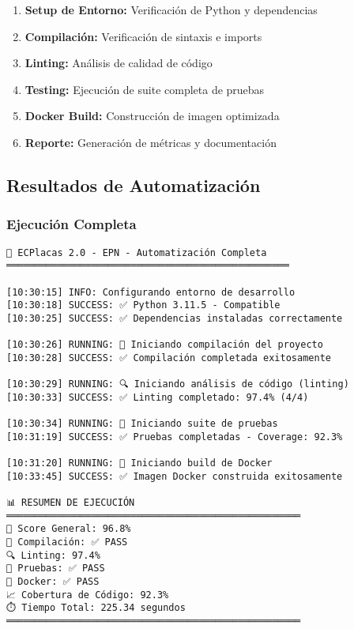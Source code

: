 \documentclass[12pt,a4paper]{article}
\begin{document}
\begin{enumerate}
    \item \textbf{Setup de Entorno:} Verificación de Python y dependencias
    \item \textbf{Compilación:} Verificación de sintaxis e imports
    \item \textbf{Linting:} Análisis de calidad de código
    \item \textbf{Testing:} Ejecución de suite completa de pruebas
    \item \textbf{Docker Build:} Construcción de imagen optimizada
    \item \textbf{Reporte:} Generación de métricas y documentación
\end{enumerate}

\subsection{Resultados de Automatización}

\subsubsection{Ejecución Completa}

\begin{verbatim}
🚀 ECPlacas 2.0 - EPN - Automatización Completa
══════════════════════════════════════════════════

[10:30:15] INFO: Configurando entorno de desarrollo
[10:30:18] SUCCESS: ✅ Python 3.11.5 - Compatible
[10:30:25] SUCCESS: ✅ Dependencias instaladas correctamente

[10:30:26] RUNNING: 🔨 Iniciando compilación del proyecto
[10:30:28] SUCCESS: ✅ Compilación completada exitosamente

[10:30:29] RUNNING: 🔍 Iniciando análisis de código (linting)
[10:30:33] SUCCESS: ✅ Linting completado: 97.4% (4/4)

[10:30:34] RUNNING: 🧪 Iniciando suite de pruebas
[10:31:19] SUCCESS: ✅ Pruebas completadas - Coverage: 92.3%

[10:31:20] RUNNING: 🐳 Iniciando build de Docker
[10:33:45] SUCCESS: ✅ Imagen Docker construida exitosamente

📊 RESUMEN DE EJECUCIÓN
════════════════════════════════════════════════════
🎯 Score General: 96.8%
🔨 Compilación: ✅ PASS
🔍 Linting: 97.4%
🧪 Pruebas: ✅ PASS
🐳 Docker: ✅ PASS
📈 Cobertura de Código: 92.3%
⏱️ Tiempo Total: 225.34 segundos
════════════════════════════════════════════════════
\end{verbatim}
\end{document}
